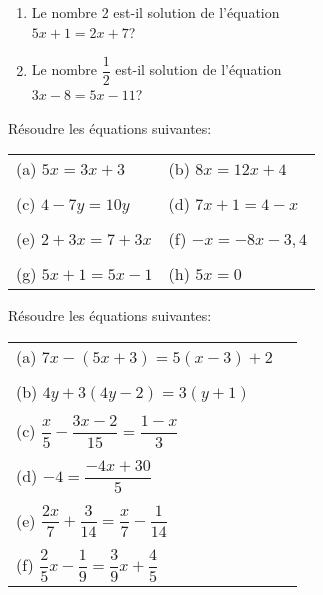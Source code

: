 

\begin{exercice}
\begin{enumerate}
\item Le nombre 2 est-il solution de l'équation\\
 $5x+1=2x+7$?
\item Le nombre $\dfrac{1}{2}$ est-il solution de l'équation\\ $3x-8=5x-11$?
\end{enumerate}
\end{exercice}


\begin{exercice}
Résoudre les équations suivantes:

\renewcommand{\arraystretch}{0.8}
\begin{tabular}{p{4cm}p{4cm}}
(a) $5x=3x+3$ & (b) $8x=12x+4$\\
&\\
(c) $4-7y=10y$ & (d) $7x+1=4-x$\\
&\\
(e) $2+3x=7+3x$ & (f) $-x=-8x-3,4$\\
&\\
(g) $5x+1=5x-1$ & (h) $5x=0$\\
\end{tabular}
\end{exercice}

\begin{exercice}
Résoudre les équations suivantes:

\renewcommand{\arraystretch}{0.8}
\begin{tabular}{p{6cm}p{1cm}}
(a) $7x-(5x+3)=5(x-3)+2$\\
&\\
(b) $4y+3(4y-2)=3(y+1)$\\
&\\
(c) $\dfrac{x}{5}-\dfrac{3x-2}{15}=\dfrac{1-x}{3}$\\
&\\
(d) $-4=\dfrac{-4x+30}{5}$\\
&\\
(e) $\dfrac{2x}{7}+\dfrac{3}{14}=\dfrac{x}{7}-\dfrac{1}{14}$\\
&\\
(f) $\dfrac{2}{5}x-\dfrac{1}{9}=\dfrac{3}{9}x+\dfrac{4}{5}$\\
\end{tabular}
\end{exercice}


